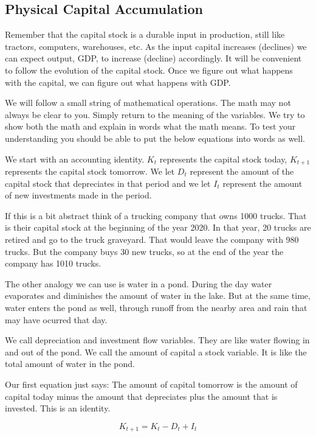 \documentclass[
]{book}
\begin{document}
\hypertarget{physical-capital-accumulation}{%
\subsection{Physical Capital Accumulation}\label{physical-capital-accumulation}}

Remember that the capital stock is a durable input in production, still like tractors, computers, warehouses, etc. As the input capital increases (declines) we can expect output, GDP, to increase (decline) accordingly. It will be convenient to follow the evolution of the capital stock. Once we figure out what happens with the capital, we can figure out what happens with GDP.

We will follow a small string of mathematical operations. The math may not always be clear to you. Simply return to the meaning of the variables. We try to show both the math and explain in words what the math means. To test your understanding you should be able to put the below equations into words as well.

We start with an accounting identity. \(K_t\) represents the capital stock today, \(K_{t+1}\) represents the capital stock tomorrow. We let \(D_t\) represent the amount of the capital stock that depreciates in that period and we let \(I_t\) represent the amount of new investments made in the period.

If this is a bit abstract think of a trucking company that owns 1000 trucks. That is their capital stock at the beginning of the year 2020. In that year, 20 trucks are retired and go to the truck graveyard. That would leave the company with 980 trucks. But the company buys 30 new trucks, so at the end of the year the company has 1010 trucks.

The other analogy we can use is water in a pond. During the day water evaporates and diminishes the amount of water in the lake. But at the same time, water enters the pond as well, through runoff from the nearby area and rain that may have ocurred that day.

We call depreciation and investment flow variables. They are like water flowing in and out of the pond. We call the amount of capital a stock variable. It is like the total amount of water in the pond.

Our first equation just says: The amount of capital tomorrow is the amount of capital today minus the amount that depreciates plus the amount that is invested. This is an identity.

\[K_{t+1}=K_t-D_t+I_t\]
\end{document}
